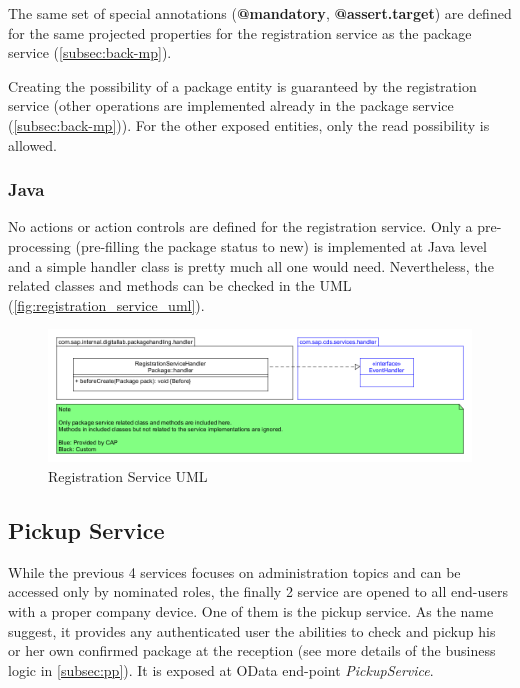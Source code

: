 \bigskip
The same set of special annotations (\textbf{@mandatory}, \textbf{@assert.target}) are defined for the same projected properties for the registration service as the package service (\autoref{subsec:back-mp}).

Creating the possibility of a package entity is guaranteed by the registration service (other operations are implemented already in the package service (\autoref{subsec:back-mp})). For the other exposed entities, only the read possibility is allowed. 

\subsubsection{Java}

No actions or action controls are defined for the registration service. Only a pre-processing (pre-filling the package status to new) is implemented at Java level and a simple handler class is pretty much all one would need. Nevertheless, the related classes and methods can be checked in the UML (\autoref{fig:registration_service_uml}). 

\begin{figure}[H]
    \centering
    \includegraphics[width=1\linewidth]{images/service_class_diagrams/registration_service_class_diagram.png}
    \caption{Registration Service UML}
    \label{fig:registration_service_uml}
\end{figure}




\subsection{Pickup Service}
\label{subsec:back-pp}

While the previous 4 services focuses on administration topics and can be accessed only by nominated roles, the finally 2 service are opened to all end-users with a proper company device. One of them is the pickup service. As the name suggest, it provides any authenticated user the abilities to check and pickup his or her own confirmed package at the reception (see more details of the business logic in \autoref{subsec:pp}). It is exposed at OData end-point \textit{PickupService}. 

